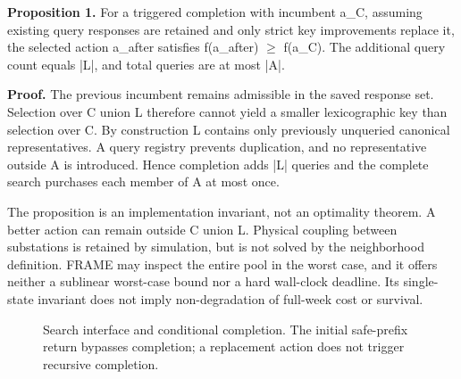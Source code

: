 \documentclass[letterpaper]{article}
\begin{document}
\textbf{Proposition 1.} For a triggered completion with incumbent a\_C, assuming existing query responses are retained and only strict key improvements replace it, the selected action a\_after satisfies f(a\_after) $\geq$ f(a\_C). The additional query count equals |L|, and total queries are at most |A|.


\textbf{Proof.} The previous incumbent remains admissible in the saved response set. Selection over C union L therefore cannot yield a smaller lexicographic key than selection over C. By construction L contains only previously unqueried canonical representatives. A query registry prevents duplication, and no representative outside A is introduced. Hence completion adds |L| queries and the complete search purchases each member of A at most once.


The proposition is an implementation invariant, not an optimality theorem. A better action can remain outside C union L. Physical coupling between substations is retained by simulation, but is not solved by the neighborhood definition. FRAME may inspect the entire pool in the worst case, and it offers neither a sublinear worst-case bound nor a hard wall-clock deadline. Its single-state invariant does not imply non-degradation of full-week cost or survival.


\begin{figure}[t]
\centering
{}
\caption{Search interface and conditional completion. The initial safe-prefix return bypasses completion; a replacement action does not trigger recursive completion.}
\label{fig:framework}
\end{figure}
\end{document}

